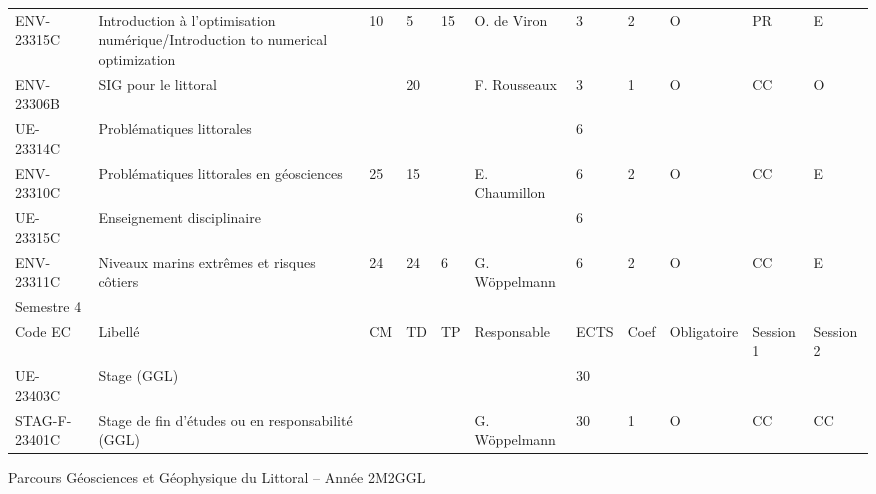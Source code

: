 \documentclass[a4paper,11pt]{article}
\begin{document}
{{\begin{tabular}{lllllllllll}
ENV-23315C    & Introduction à l'optimisation numérique/Introduction to numerical optimization                & 10 & 5  & 15 & O. de Viron     & 3    & 2    & O           & PR             & E         \\
ENV-23306B    & SIG pour le littoral                                                                          &    & 20 &    & F. Rousseaux    & 3    & 1    & O           & CC             & O         \\
\rowcolor[HTML]{C0C0C0} 
UE-23314C     & Problématiques littorales                                                                     &    &    &    &                 & 6    &      &             &                &           \\
ENV-23310C    & Problématiques littorales en géosciences                                                      & 25 & 15 &    & E. Chaumillon   & 6    & 2    & O           & CC             & E         \\
\rowcolor[HTML]{C0C0C0} 
UE-23315C     & Enseignement disciplinaire                                                                    &    &    &    &                 & 6    &      &             &                &           \\
ENV-23311C    & Niveaux marins extrêmes et risques côtiers                                                    & 24 & 24 & 6  & G. Wöppelmann   & 6    & 2    & O           & CC             & E         \\
\rowcolor[HTML]{656565} 
Semestre 4    &                                                                                               &    &    &    &                 &      &      &             &                &           \\
\rowcolor[HTML]{9B9B9B} 
Code EC       & Libellé                                                                                       & CM & TD & TP & Responsable     & ECTS & Coef & Obligatoire & Session 1      & Session 2 \\
\rowcolor[HTML]{C0C0C0} 
UE-23403C     & Stage (GGL)                                                                                   &    &    &    &                 & 30   &      &             &                &           \\
STAG-F-23401C & Stage de fin d'études ou en responsabilité (GGL)                                              &    &    &    & G. Wöppelmann   & 30   & 1    & O           & CC             & CC       
\end{tabular}}
}{Parcours Géosciences et Géophysique du Littoral -- Année 2}{M2GGL}
\end{document}

